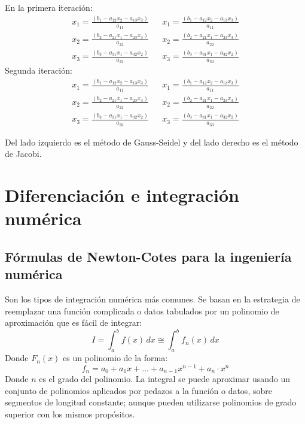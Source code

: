 En la primera iteración:
\begin{align*}
    x_1 = \frac{\left(b_1 - a_{12}x_2 - a_{13}x_3 \right)}{a_{11}} && x_1 = \frac{\left(b_1 - a_{12}x_2 - a_{13}x_3 \right)}{a_{11}}\\
    x_2 = \frac{\left(b_2 - a_{21}x_1 - a_{23}x_3 \right)}{a_{22}}&& x_2 = \frac{\left(b_2 - a_{21}x_1 - a_{23}x_3\right)}{a_{22}}\\
    x_3 = \frac{\left(b_3 - a_{31}x_1 - a_{32}x_2\right)}{a_{33}} && x_3 = \frac{\left(b_3 - a_{31}x_1 - a_{32}x_2\right)}{a_{33}}
\end{align*}
Segunda iteración:
\begin{align*}
    x_1 = \frac{\left(b_1 - a_{12}x_2 - a_{13}x_3 \right)}{a_{11}} && x_1 = \frac{\left(b_1 - a_{12}x_2 - a_{13}x_3 \right)}{a_{11}}\\
    x_2 = \frac{\left(b_2 - a_{21}x_1 - a_{23}x_3 \right)}{a_{22}}&& x_2 = \frac{\left(b_2 - a_{21}x_1 - a_{23}x_3\right)}{a_{22}}\\
    x_3 = \frac{\left(b_3 - a_{31}x_1 - a_{32}x_2\right)}{a_{33}} && x_3 = \frac{\left(b_3 - a_{31}x_1 - a_{32}x_2\right)}{a_{33}}
\end{align*}

Del lado izquierdo es el método de Gauss-Seidel y del lado derecho es el método de Jacobi.

\section{Diferenciación e integración numérica}

\subsection{Fórmulas de Newton-Cotes para la ingeniería numérica}

Son los tipos de integración numérica más comunes. Se basan en la estrategia de reemplazar una función complicada o datos tabulados por un polinomio de aproximación que es fácil de integrar:
\begin{equation}
    I = \int_a^b f(x)\, dx\cong \int_a^b f_n(x)\,dx
\end{equation}
Donde $F_n(x)$ es un polinomio de la forma:
\begin{equation}
    f_n = a_0 + a_1x +\dots +a_{n- 1}x^{n - 1} + a_n \cdot x^n
\end{equation}
Donde $n$ es el grado del polinomio. La integral se puede aproximar usando un conjunto de polinomios aplicados por pedazos a la función o datos, sobre segmentos de longitud constante; aunque pueden utilizarse polinomios de grado superior con los mismos propósitos. 

